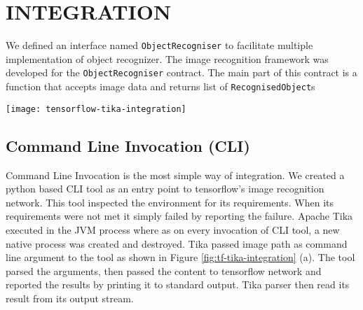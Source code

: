 \section{INTEGRATION} \label{sec:integration}
We defined an interface named \texttt{ObjectRecogniser} to facilitate multiple implementation of object recognizer. The image recognition framework was developed for the \texttt{ObjectRecogniser} contract. The main part of this contract is a function that accepts image data and returns list of \texttt{RecognisedObject}s


\iffalse
The following methods of integration were investigated in the order of listing:
\begin{itemize}
\item Command Line Invocation
\item Java Native Interface
\item gRPC Remote Procedure Calls
\item Representational State Transfer API
\end{itemize}
\fi

\begin{figure*}
	\texttt{[image: tensorflow-tika-integration]}
	\caption{Tika and Tensorflow Integration}
	\label{fig:tf-tika-integration}
\end{figure*}

\subsection{Command Line Invocation (CLI)} \label{sec:int-cli}
Command Line Invocation is the most simple way of integration. We created a python based CLI tool as an entry point to tensorflow's image recognition network. This tool inspected the environment for its requirements. When its requirements were not met it simply failed by reporting the failure. 
Apache Tika executed in the JVM process where as on every invocation of CLI tool, a new native process was created and destroyed. Tika passed image path as command line argument to the tool as shown in Figure \ref{fig:tf-tika-integration} (a). The tool parsed the arguments, then passed the content to tensorflow network and reported the results by printing it to standard output. Tika parser then read its result from its output stream.

